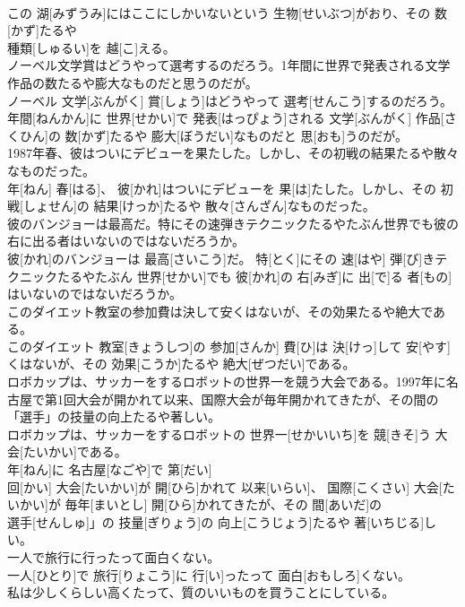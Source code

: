 \documentclass[8pt]{extreport}
\begin{document}
\begin{CJK}{UTF8}{min}
\\	この 湖[みずうみ]にはここにしかいないという 生物[せいぶつ]がおり、その 数[かず]たるや 
\\	種類[しゅるい]を 越[こ]える。
\\	ノーベル文学賞はどうやって選考するのだろう。1年間に世界で発表される文学作品の数たるや膨大なものだと思うのだが。	
\\	ノーベル 文学[ぶんがく] 賞[しょう]はどうやって 選考[せんこう]するのだろう。 
\\	年間[ねんかん]に 世界[せかい]で 発表[はっぴょう]される 文学[ぶんがく] 作品[さくひん]の 数[かず]たるや 膨大[ぼうだい]なものだと 思[おも]うのだが。
\\	1987年春、彼はついにデビューを果たした。しかし、その初戦の結果たるや散々なものだった。	
\\	年[ねん] 春[はる]、 彼[かれ]はついにデビューを 果[は]たした。しかし、その 初戦[しょせん]の 結果[けっか]たるや 散々[さんざん]なものだった。
\\	彼のバンジョーは最高だ。特にその速弾きテクニックたるやたぶん世界でも彼の右に出る者はいないのではないだろうか。	
\\	彼[かれ]のバンジョーは 最高[さいこう]だ。 特[とく]にその 速[はや] 弾[び]きテクニックたるやたぶん 世界[せかい]でも 彼[かれ]の 右[みぎ]に 出[で]る 者[もの]はいないのではないだろうか。
\\	このダイエット教室の参加費は決して安くはないが、その効果たるや絶大である。	
\\	このダイエット 教室[きょうしつ]の 参加[さんか] 費[ひ]は 決[けっ]して 安[やす]くはないが、その 効果[こうか]たるや 絶大[ぜつだい]である。
\\	ロボカップは、サッカーをするロボットの世界一を競う大会である。1997年に名古屋で第1回大会が開かれて以来、国際大会が毎年開かれてきたが、その間の「選手」の技量の向上たるや著しい。	
\\	ロボカップは、サッカーをするロボットの 世界一[せかいいち]を 競[きそ]う 大会[たいかい]である。 
\\	年[ねん]に 名古屋[なごや]で 第[だい] 
\\	回[かい] 大会[たいかい]が 開[ひら]かれて 以来[いらい]、 国際[こくさい] 大会[たいかい]が 毎年[まいとし] 開[ひら]かれてきたが、その 間[あいだ]の
\\	選手[せんしゅ]」の 技量[ぎりょう]の 向上[こうじょう]たるや 著[いちじる]しい。
\\	一人で旅行に行ったって面白くない。	
\\	一人[ひとり]で 旅行[りょこう]に 行[い]ったって 面白[おもしろ]くない。
\\	私は少しくらしい高くたって、質のいいものを買うことにしている。	

\end{CJK}
\end{document}
